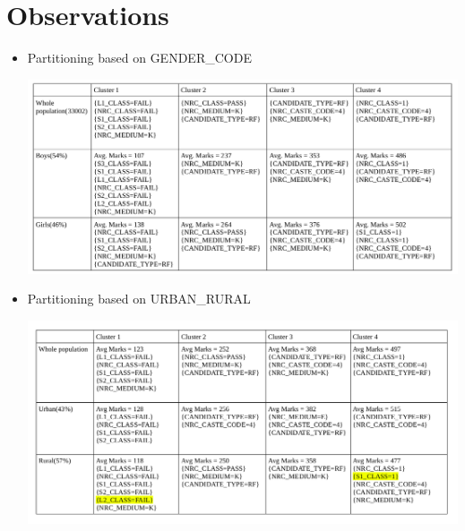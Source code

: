 \section*{Observations}
\begin{itemize}
\item Partitioning based on GENDER{\_}CODE

\includegraphics[scale=0.4]{img/boys_girls.png}

\item Partitioning based on URBAN{\_}RURAL

\includegraphics[scale=0.4]{img/urban_rural.png}

\end{itemize}


